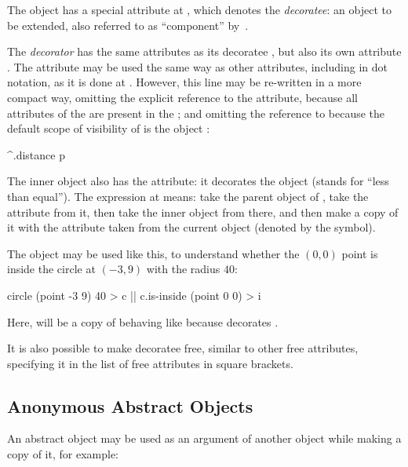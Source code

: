 The object  has a special attribute 
at , which denotes
the \emph{decoratee}: an object to be extended,
also referred to as ``component'' by~\citet{gamma1994design}.

The \emph{decorator} 
has the same attributes as its decoratee , but also
its own attribute . The attribute  may be used
the same way as other attributes, including in dot notation, as it is done
at . However, this line
may be re-written in a more compact way, omitting the explicit
reference to the  attribute, because all attributes
of the  are present in the ;
and omitting the reference to \ff{\$} because the default scope of visibility of
 is the object :

\begin{ffcode}
^.distance p
\end{ffcode}

The inner object  also has the  attribute: it
decorates the object  (stands for ``less than equal'').
The expression at  means:
take the parent object of ,
take the attribute  from it, then take the inner object 
from there, and then make a copy of it with the attribute 
taken from the current object (denoted by the \ff{\$} symbol).

The object  may be used like this, to understand whether
the $(0,0)$ point is inside the circle at $(-3,9)$ with the radius $40$:

\begin{ffcode}
circle (point -3 9) 40 > c  |$\label{ln:circle-c}$|
c.is-inside (point 0 0) > i
\end{ffcode}

Here,  will be a copy of  behaving like 
because  decorates .

It is also possible to make decoratee free, similar to other free
attributes, specifying it in the list of free attributes in
square brackets.

\subsection{Anonymous Abstract Objects}

An abstract object may be used as an argument of another object while
making a copy of it, for example:

